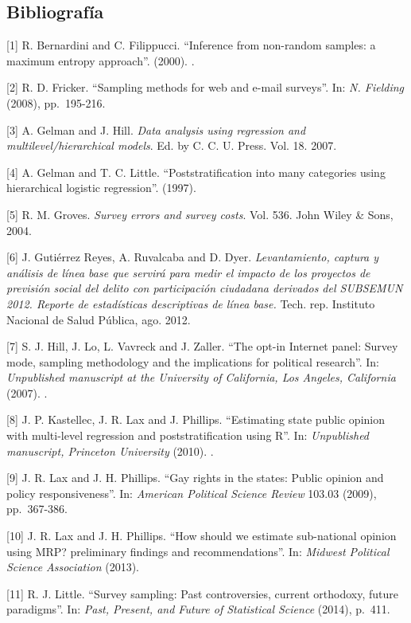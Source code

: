 \documentclass[]{article}
\begin{document}
\pagebreak

\subsection{Bibliografía}\label{bibliografia-1}

{[}1{]} R. Bernardini and C. Filippucci. ``Inference from non-random
samples: a maximum entropy approach''. (2000). .

{[}2{]} R. D. Fricker. ``Sampling methods for web and e-mail surveys''.
In: \emph{N. Fielding} (2008), pp.~195-216.

{[}3{]} A. Gelman and J. Hill. \emph{Data analysis using regression and
multilevel/hierarchical models}. Ed. by C. C. U. Press. Vol. 18. 2007.

{[}4{]} A. Gelman and T. C. Little. ``Poststratification into many
categories using hierarchical logistic regression''. (1997).

{[}5{]} R. M. Groves. \emph{Survey errors and survey costs}. Vol. 536.
John Wiley \& Sons, 2004.

{[}6{]} J. Gutiérrez Reyes, A. Ruvalcaba and D. Dyer.
\emph{Levantamiento, captura y análisis de línea base que servirá para
medir el impacto de los proyectos de previsión social del delito con
participación ciudadana derivados del SUBSEMUN 2012. Reporte de
estadísticas descriptivas de línea base.} Tech. rep. Instituto Nacional
de Salud Pública, ago. 2012.

{[}7{]} S. J. Hill, J. Lo, L. Vavreck and J. Zaller. ``The opt-in
Internet panel: Survey mode, sampling methodology and the implications
for political research''. In: \emph{Unpublished manuscript at the
University of California, Los Angeles, California} (2007). .

{[}8{]} J. P. Kastellec, J. R. Lax and J. Phillips. ``Estimating state
public opinion with multi-level regression and poststratification using
R''. In: \emph{Unpublished manuscript, Princeton University} (2010). .

{[}9{]} J. R. Lax and J. H. Phillips. ``Gay rights in the states: Public
opinion and policy responsiveness''. In: \emph{American Political
Science Review} 103.03 (2009), pp.~367-386.

{[}10{]} J. R. Lax and J. H. Phillips. ``How should we estimate
sub-national opinion using MRP? preliminary findings and
recommendations''. In: \emph{Midwest Political Science Association}
(2013).

{[}11{]} R. J. Little. ``Survey sampling: Past controversies, current
orthodoxy, future paradigms''. In: \emph{Past, Present, and Future of
Statistical Science} (2014), p.~411.
\end{document}
